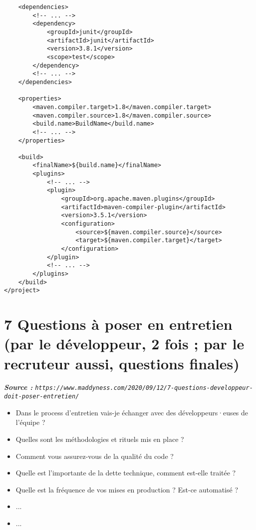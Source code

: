 \documentclass[11pt,twoside,a4paper]{article}
\begin{document}
\begin{landscape}
\begin{multicols}{2}
\begin{verbatim}
    <dependencies>
        <!-- ... -->
        <dependency>
            <groupId>junit</groupId>
            <artifactId>junit</artifactId>
            <version>3.8.1</version>
            <scope>test</scope>
        </dependency>
        <!-- ... -->
    </dependencies>
    
    <properties>
        <maven.compiler.target>1.8</maven.compiler.target>
        <maven.compiler.source>1.8</maven.compiler.source>
        <build.name>BuildName</build.name>
        <!-- ... -->
    </properties>
    
    <build>
        <finalName>${build.name}</finalName>
        <plugins>
            <!-- ... -->
            <plugin>
                <groupId>org.apache.maven.plugins</groupId>
                <artifactId>maven-compiler-plugin</artifactId>
                <version>3.5.1</version>
                <configuration>
                    <source>${maven.compiler.source}</source>
                    <target>${maven.compiler.target}</target>
                </configuration>
            </plugin>
            <!-- ... -->
        </plugins>
    </build>
</project>
	\end{verbatim}
	\normalsize
	
	\vfill
	\columnbreak
	
	\section*{7 Questions {\`a} poser en entretien (par le d{\'e}veloppeur, 2 fois ; par le recruteur aussi, questions finales)}
	
	\emph{\footnotesize \textbf{Source : } \texttt{https://www.maddyness.com/2020/09/12/7-questions-developpeur-doit-poser-entretien/} }
	\begin{itemize}
		\item Dans le process d'entretien vais-je {\'e}changer avec des d{\'e}veloppeurs·euses de l'{\'e}quipe ? 
		\item Quelles sont les m{\'e}thodologies et rituels mis en place ?
		\item Comment vous assurez-vous de la qualit{\'e} du code ?
		\item Quelle est l'importante de la dette technique, comment est-elle trait{\'e}e ?
		\item Quelle est la fr{\'e}quence de vos mises en production ? Est-ce automatis{\'e} ?
		\item ... 
		\item ... 
	\end{itemize}
	

\end{multicols}
\end{landscape}
\end{document}

